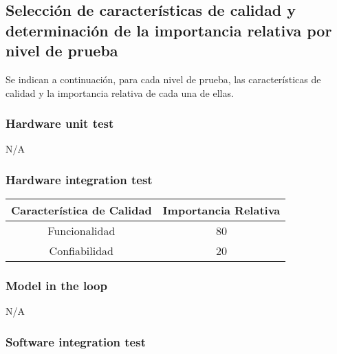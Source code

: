 \documentclass[
11pt, %
]{charter}
\begin{document}
\subsection{Selección de características de calidad y determinación de la importancia relativa por nivel de prueba}
\label{sec:orgd0babc0}

Se indican a continuación, para cada nivel de prueba, las características de
calidad y la importancia relativa de cada una de ellas.

\subsubsection{Hardware unit test}
\label{sec:org31d2978}

N/A

\newpage 

\subsubsection{Hardware integration test}

\begin{table}[h!]
\begin{center}
\begin{tabular}{| c | c |}
\hline
\rowcolor[HTML]{C0C0C0}
Característica de Calidad	& 	Importancia Relativa  \\ \hline
Funcionalidad          		&   80					  \\ \hline
Confiabilidad   			&   20					  \\ \hline
\end{tabular}
\label{tab:HW-FWIntegr}
\end{center}
\end{table} 

\subsubsection{Model in the loop}

N/A

\subsubsection{Software integration test}
\end{document}
